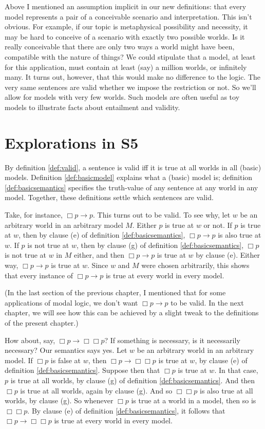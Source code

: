 Above I mentioned an assumption implicit in our new definitions: that every
model represents a pair of a conceivable scenario and interpretation. This isn't
obvious. For example, if our topic is metaphysical possibility and necessity, it
may be hard to conceive of a scenario with exactly two possible worlds. Is it
really conceivable that there are only two ways a world might have been,
compatible with the nature of things? We could stipulate that a model, at least
for this application, must contain at least (say) a million worlds, or
infinitely many. It turns out, however, that this would make no difference to
the logic. The very same sentences are valid whether we impose the restriction
or not. So we'll allow for models with very few worlds. Such models are often
useful as toy models to illustrate facts about entailment and validity.

\section{Explorations in S5}%
\label{sec:basiclogic}

By definition \ref{def:valid}, a sentence is valid iff it is true at all worlds
in all (basic) models. Definition \ref{def:basicmodel} explains what a (basic)
model is; definition \ref{def:basicsemantics} specifies the truth-value of any
sentence at any world in any model. Together, these definitions settle which
sentences are valid.

Take, for instance, $\Box p \to p$. This turns out to be valid. To see why, let
$w$ be an arbitrary world in an arbitrary model $M$. Either $p$ is true at $w$
or not. If $p$ is true at $w$, then by clause (e) of definition
\ref{def:basicsemantics}, $\Box p \to p$ is also true at $w$. If $p$ is not true
at $w$, then by clause (g) of definition \ref{def:basicsemantics}, $\Box p$ is
not true at $w$ in $M$ either, and then $\Box p \to p$ is true at $w$ by clause
(e). Either way, $\Box p \to p$ is true at $w$. Since $w$ and $M$ were chosen
arbitrarily, this shows that every instance of $\Box p \to p$ is true at every
world in every model.

(In the last section of the previous chapter, I mentioned that for some
applications of modal logic, we don't want $\Box p \to p$ to be valid. In the
next chapter, we will see how this can be achieved by a slight tweak to the
definitions of the present chapter.)

How about, say, $\Box p \to \Box \Box p$? If something is necessary, is it
necessarily necessary? Our semantics says yes. Let $w$ be an arbitrary world in
an arbitrary model. If $\Box p$ is false at $w$, then $\Box p \to \Box\Box p$ is
true at $w$, by clause (e) of definition \ref{def:basicsemantics}. Suppose then
that $\Box p$ is true at $w$. In that case, $p$ is true at all worlds, by clause
(g) of definition \ref{def:basicsemantics}. And then $\Box p$ is true at all
worlds, again by clause (g). And so $\Box\Box p$ is also true at all worlds, by
clause (g). So whenever $\Box p$ is true at a world in a model, then so is
$\Box\Box p$. By clause (e) of definition \ref{def:basicsemantics}, it follows
that $\Box p \to \Box\Box p$ is true at every world in every model.

